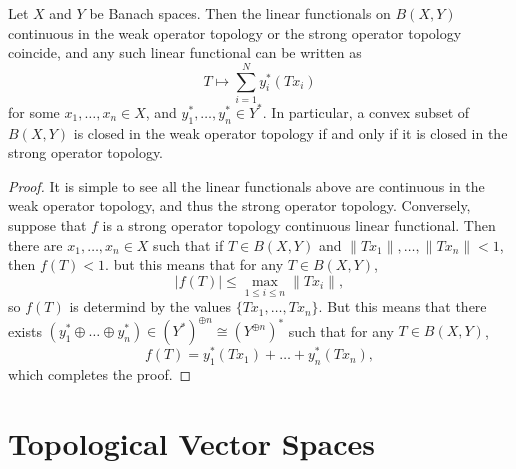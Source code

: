 \begin{theorem}
    Let $X$ and $Y$ be Banach spaces. Then the linear functionals on $B(X,Y)$ continuous in the weak operator topology or the strong operator topology coincide, and any such linear functional can be written as
    \[ T \mapsto \sum_{i = 1}^N y_i^*(Tx_i) \]
    for some $x_1,\dots,x_n \in X$, and $y_1^*, \dots, y_n^* \in Y^*$. In particular, a convex subset of $B(X,Y)$ is closed in the weak operator topology if and only if it is closed in the strong operator topology.
\end{theorem}
\begin{proof}
    It is simple to see all the linear functionals above are continuous in the weak operator topology, and thus the strong operator topology. Conversely, suppose that $f$ is a strong operator topology continuous linear functional. Then there are $x_1,\dots,x_n \in X$ such that if $T \in B(X,Y)$ and $\| Tx_1 \|, \dots, \| Tx_n \| < 1$, then $f(T) < 1$. but this means that for any $T \in B(X,Y)$,
    \[ |f(T)| \leq \max_{1 \leq i \leq n} \| Tx_i \|, \]
    so $f(T)$ is determind by the values $\{ Tx_1, \dots, Tx_n \}$. But this means that there exists $(y_1^* \oplus \dots \oplus y_n^*) \in (Y^*)^{\oplus n} \cong (Y^{\oplus n})^*$ such that for any $T \in B(X,Y)$,
    \[ f(T) = y_1^*(Tx_1) + \dots + y_n^*(Tx_n), \]
    which completes the proof.
\end{proof}























\chapter{Topological Vector Spaces}

